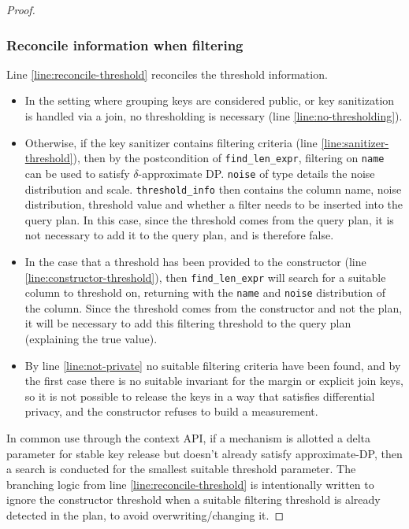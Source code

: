 \documentclass{article}
\begin{document}
\begin{proof}
\subsubsection{Reconcile information when filtering}
Line \ref{line:reconcile-threshold} reconciles the threshold information.
\begin{itemize}
    \item In the setting where grouping keys are considered public, 
    or key sanitization is handled via a join, no thresholding is necessary (line \ref{line:no-thresholding}).
    \item Otherwise, if the key sanitizer contains filtering criteria (line \ref{line:sanitizer-threshold}),
    then by the postcondition of \texttt{find\_len\_expr}, filtering on \texttt{name} can be used to satisfy 
    $\delta$-approximate DP.
    \texttt{noise} of type  details the noise distribution and scale. 
    \texttt{threshold\_info} then contains the column name, noise distribution, threshold value and whether a filter needs to be inserted into the query plan.
    In this case, since the threshold comes from the query plan, it is not necessary to add it to the query plan, and is therefore false.
    \item In the case that a threshold has been provided to the constructor (line \ref{line:constructor-threshold}),
    then \texttt{find\_len\_expr} will search for a suitable column to threshold on, 
    returning with the \texttt{name} and \texttt{noise} distribution of the column.
    Since the threshold comes from the constructor and not the plan, it will be necessary to add this filtering threshold to the query plan (explaining the true value).
    \item By line \ref{line:not-private} no suitable filtering criteria have been found, 
    and by the first case there is no suitable invariant for the margin or explicit join keys,
    so it is not possible to release the keys in a way that satisfies differential privacy,
    and the constructor refuses to build a measurement.
\end{itemize}

In common use through the context API, if a mechanism is allotted a delta parameter for stable key release but doesn't already satisfy approximate-DP,
then a search is conducted for the smallest suitable threshold parameter.
The branching logic from line \ref{line:reconcile-threshold} is intentionally written to ignore the constructor threshold 
when a suitable filtering threshold is already detected in the plan, to avoid overwriting/changing it.


\end{proof}
\end{document}
